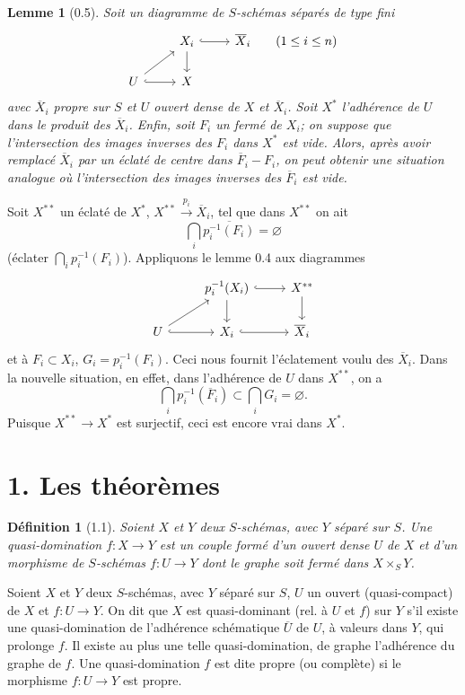\documentclass[10pt,a4paper]{article}
\theoremstyle{deligne}
\newtheorem*{lemma*}{Lemme}
\newtheorem*{definition*}{Définition}
\begin{document}
\begin{lemma*}[0.5]
Soit un diagramme de \(S\)-schémas séparés de type fini
\[
\begin{tikzcd}[column sep=2.4em,row sep=1.6em]
& X_i \arrow[r,hook] \arrow[d] & \overline X_i \qquad (1\le i\le n) \\
U \arrow[ur] \arrow[r,hook] & X
\end{tikzcd}
\]
avec \(\overline X_i\) propre sur \(S\) et \(U\) ouvert dense de \(X\) et \(\overline X_i\). Soit \(X^*\) l'adhérence de \(U\) dans le produit des \(\overline X_i\). Enfin, soit \(F_i\) un fermé de \(X_i\); on suppose que l'intersection des images inverses des \(F_i\) dans \(X^*\) est vide. Alors, après avoir remplacé \(\overline X_i\) par un éclaté de centre dans \(\overline F_i-F_i\), on peut obtenir une situation analogue où l'intersection des images inverses des \(\overline F_i\) est vide.
\end{lemma*}

Soit \(X^{**}\) un éclaté de \(X^*\), \(X^{**}\xrightarrow{p_i}\overline X_i\), tel que dans \(X^{**}\) on ait
\[
\bigcap_i \overline{p_i^{-1}(F_i)}=\varnothing
\]
(éclater \(\bigcap_i p_i^{-1}(F_i)\)). Appliquons le lemme 0.4 aux diagrammes
\[
\begin{tikzcd}[column sep=2.5em,row sep=1.6em]
& p_i^{-1}(X_i) \arrow[r,hook] \arrow[d] & X^{**} \arrow[d] \\
U \arrow[ur] \arrow[r,hook] & X_i \arrow[r,hook] & \overline X_i
\end{tikzcd}
\]
et à \(F_i\subset X_i\), \(G_i=p_i^{-1}(F_i)\). Ceci nous fournit l'éclatement voulu des \(\overline X_i\). Dans la nouvelle situation, en effet, dans l'adhérence de \(U\) dans \(X^{**}\), on a
\[
\bigcap_i p_i^{-1}(\overline F_i)\subset \bigcap_i G_i=\varnothing.
\]
Puisque \(X^{**}\to X^*\) est surjectif, ceci est encore vrai dans \(X^*\).

\section*{1. Les théorèmes}

\begin{definition*}[1.1]
Soient \(X\) et \(Y\) deux \(S\)-schémas, avec \(Y\) séparé sur \(S\). Une quasi-domination \(f:X\to Y\) est un couple formé d'un ouvert dense \(U\) de \(X\) et d'un morphisme de \(S\)-schémas \(f:U\to Y\) dont le graphe soit fermé dans \(X\times_S Y\).
\end{definition*}

Soient \(X\) et \(Y\) deux \(S\)-schémas, avec \(Y\) séparé sur \(S\), \(U\) un ouvert (quasi-compact) de \(X\) et \(f:U\to Y\). On dit que \(X\) est quasi-dominant (rel. à \(U\) et \(f\)) sur \(Y\) s'il existe une quasi-domination de l'adhérence schématique \(\overline U\) de \(U\), à valeurs dans \(Y\), qui prolonge \(f\). Il existe au plus une telle quasi-domination, de graphe l'adhérence du graphe de \(f\). Une quasi-domination \(f\) est dite propre (ou complète) si le morphisme \(f:U\to Y\) est propre.
\end{document}
